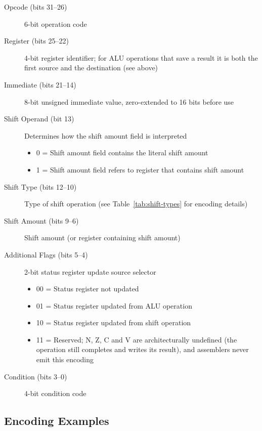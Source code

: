 \begin{description}
	\item[Opcode (bits 31--26)] 6-bit operation code
	\item[Register (bits 25--22)] 4-bit register identifier; for ALU operations that save a result it is both the first source
	      and the destination (see above)
	\item[Immediate (bits 21--14)] 8-bit unsigned immediate value, zero-extended to 16 bits before use
	\item[Shift Operand (bit 13)] Determines how the shift amount field is interpreted
	      \begin{itemize}
		      \item 0 = Shift amount field contains the literal shift amount
		      \item 1 = Shift amount field refers to register that contains shift amount
	      \end{itemize}
	\item[Shift Type (bits 12--10)] Type of shift operation (see Table~\ref{tab:shift-types} for encoding details)
	\item[Shift Amount (bits 9--6)] Shift amount (or register containing shift amount)
	\item[Additional Flags (bits 5--4)] 2-bit status register update source selector
	      \begin{itemize}
		      \item 00 = Status register not updated
		      \item 01 = Status register updated from ALU operation
		      \item 10 = Status register updated from shift operation
		      \item 11 = Reserved; N, Z, C and V are architecturally undefined (the operation still completes and writes its result), and assemblers never emit this encoding
	      \end{itemize}
	\item[Condition (bits 3--0)] 4-bit condition code
\end{description}

\subsection{Encoding Examples}



